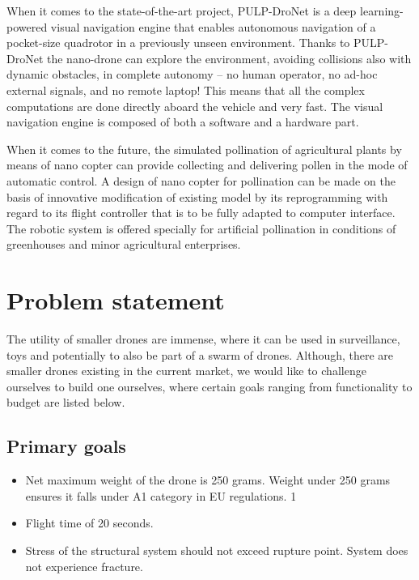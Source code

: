 \documentclass[a4paper,11pt]{article}
\begin{document}
When it comes to the state-of-the-art project, PULP-DroNet is a deep learning-powered visual navigation engine that enables autonomous navigation of a pocket-size quadrotor in a previously unseen environment. Thanks to PULP-DroNet the nano-drone can explore the environment, avoiding collisions also with dynamic obstacles, in complete autonomy -- no human operator, no ad-hoc external signals, and no remote laptop! This means that all the complex computations are done directly aboard the vehicle and very fast. The visual navigation engine is composed of both a software and a hardware part. \cite{Niculescu2021}

When it comes to the future, the simulated pollination of agricultural plants by means of nano copter can provide collecting and delivering pollen in the mode of automatic control. A design of nano copter for pollination can be made on the basis of innovative modification of existing model by its reprogramming with regard to its flight controller that is to be fully adapted to computer interface. The robotic system is offered specially for artificial pollination in conditions of greenhouses and minor agricultural enterprises. \cite{Abutalipov2016}


\section{Problem statement}

The utility of smaller drones are immense, where it can be used in surveillance, toys and potentially to also be part of a swarm of drones. Although, there are smaller drones existing in the current market, we would like to challenge ourselves to build one ourselves, where certain goals ranging from functionality to budget are listed below.


\subsection{Primary goals }
\begin{itemize}
    \item
          Net maximum weight of the drone is 250 grams. Weight under 250 grams ensures it falls under A1 category in EU regulations. 1
    \item
          Flight time of 20 seconds.
    \item
          Stress of the structural system should not exceed rupture point. System does not experience fracture.
\end{itemize}
\end{document}
